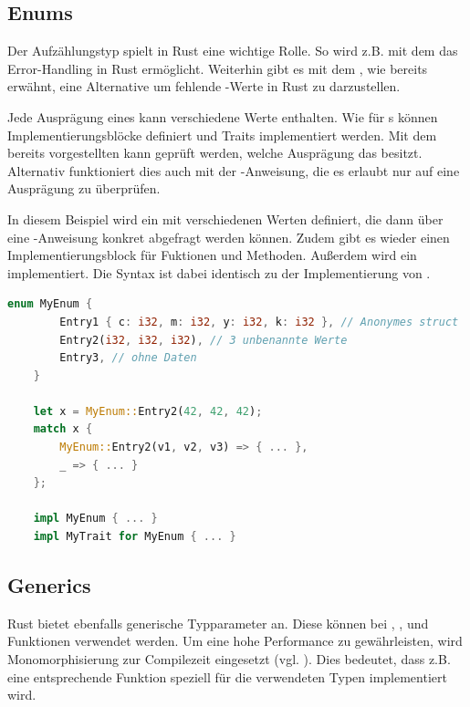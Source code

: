 \documentclass[11pt,a4paper, ngerman]{article}
\begin{document}
\subsection{Enums}
Der Aufzählungstyp  spielt in Rust eine wichtige Rolle. So wird z.B. mit dem   das Error-Handling in Rust ermöglicht. Weiterhin gibt es mit dem  , wie bereits erwähnt, eine Alternative um fehlende -Werte in Rust zu darzustellen.

Jede Ausprägung eines  kann verschiedene Werte enthalten. Wie für s können Implementierungsblöcke definiert und Traits implementiert werden. Mit dem bereits vorgestellten  kann geprüft werden, welche Ausprägung das  besitzt. Alternativ funktioniert dies auch mit der -Anweisung, die es erlaubt nur auf eine Ausprägung zu überprüfen.

In diesem Beispiel wird ein  mit verschiedenen Werten definiert, die dann über eine -Anweisung konkret abgefragt werden können. Zudem gibt es wieder einen Implementierungsblock für Fuktionen und Methoden. Außerdem wird ein  implementiert. Die Syntax ist dabei identisch zu der Implementierung von .

\begin{lstlisting}[language=rust, caption={enum}]
    enum MyEnum {
        Entry1 { c: i32, m: i32, y: i32, k: i32 }, // Anonymes struct
        Entry2(i32, i32, i32), // 3 unbenannte Werte
        Entry3, // ohne Daten
    }

    let x = MyEnum::Entry2(42, 42, 42);
    match x {
        MyEnum::Entry2(v1, v2, v3) => { ... },
        _ => { ... }
    };

    impl MyEnum { ... }
    impl MyTrait for MyEnum { ... }
\end{lstlisting}

\subsection{Generics}
Rust bietet ebenfalls generische Typparameter an. Diese können bei , ,  und Funktionen verwendet werden. Um eine hohe Performance zu gewährleisten, wird Monomorphisierung zur Compilezeit eingesetzt (vgl. \cite[S. 196 ff.]{SK19}). Dies bedeutet, dass z.B. eine entsprechende Funktion speziell für die verwendeten Typen implementiert wird.
\end{document}
